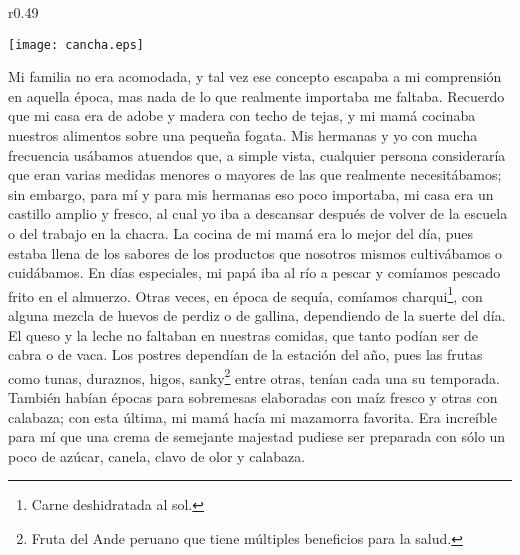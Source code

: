 \ifdefined\EnableIncludeImages
\begin{wrapfigure}{r}{0.49\textwidth}
  \begin{center}
  \vspace{-20pt}
    \texttt{[image: cancha.eps]}
  \end{center}
  \vspace{-20pt}
\end{wrapfigure}
\fi
Mi familia no era acomodada, y tal vez ese concepto escapaba a mi comprensión en aquella época, mas nada de lo que realmente importaba me faltaba.   
Recuerdo que mi casa era de adobe y madera con techo de tejas, y mi mamá cocinaba nuestros alimentos sobre una pequeña fogata. Mis hermanas y yo con mucha frecuencia usábamos atuendos que, a simple vista, cualquier persona consideraría que eran varias medidas menores o mayores de las que realmente necesitábamos;
sin embargo, para mí y para mis hermanas eso poco importaba, mi casa era un castillo amplio y fresco, al cual yo iba a descansar después de volver de la escuela o del trabajo en la chacra.
La cocina de mi mamá era lo mejor del día, pues estaba llena de los sabores de los productos que nosotros mismos cultivábamos o cuidábamos. 
En días especiales, mi papá iba al río a pescar y comíamos pescado frito en el almuerzo. Otras veces, en época de sequía, comíamos charqui\footnote{Carne deshidratada al sol.}, con alguna mezcla de huevos de perdiz o de gallina, dependiendo de la suerte del día.
El queso y la leche no faltaban en nuestras comidas, que tanto podían ser de cabra o de vaca.
Los postres dependían de la estación del año, pues las frutas como tunas, duraznos, higos, sanky\footnote{Fruta del Ande peruano que tiene múltiples beneficios para la salud.} entre otras, tenían cada una su temporada. También habían épocas para sobremesas elaboradas con maíz fresco y otras con calabaza; con esta última, mi mamá hacía mi mazamorra favorita. Era increíble para mí que una crema de semejante majestad pudiese ser preparada con sólo un poco de azúcar, canela, clavo de olor y calabaza.

